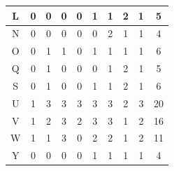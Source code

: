 \documentclass[submit,ses,noauthor]{ipsj}
\begin{document}
\begin{table}[t]
\begin{minipage}[t]{0.5\linewidth}
{\begin{tabular}{c|c|cccccccc}
\rowcolor{blue!30}%
L                   & 0                                           & \multicolumn{1}{c|}{0} & \multicolumn{1}{c|}{0} & \multicolumn{1}{c|}{0} & \multicolumn{1}{c|}{1} & \multicolumn{1}{c|}{1} & \multicolumn{1}{c|}{2} & \multicolumn{1}{c|}{1} & 5  \\ \hline
\rowcolor{blue!30}%
N                   & 0                                           & \multicolumn{1}{c|}{0} & \multicolumn{1}{c|}{0} & \multicolumn{1}{c|}{0} & \multicolumn{1}{c|}{0} & \multicolumn{1}{c|}{2} & \multicolumn{1}{c|}{1} & \multicolumn{1}{c|}{1} & 4  \\ \hline
O                   & 0                                           & \multicolumn{1}{c|}{1} & \multicolumn{1}{c|}{1} & \multicolumn{1}{c|}{0} & \multicolumn{1}{c|}{1} & \multicolumn{1}{c|}{1} & \multicolumn{1}{c|}{1} & \multicolumn{1}{c|}{1} & 6  \\ \hline
\rowcolor{blue!30}%
Q                   & 0                                           & \multicolumn{1}{c|}{1} & \multicolumn{1}{c|}{0} & \multicolumn{1}{c|}{0} & \multicolumn{1}{c|}{0} & \multicolumn{1}{c|}{1} & \multicolumn{1}{c|}{2} & \multicolumn{1}{c|}{1} & 5  \\ \hline
S                   & 0                                           & \multicolumn{1}{c|}{1} & \multicolumn{1}{c|}{0} & \multicolumn{1}{c|}{0} & \multicolumn{1}{c|}{1} & \multicolumn{1}{c|}{1} & \multicolumn{1}{c|}{2} & \multicolumn{1}{c|}{1} & 6  \\ \hline
U                   & 1                                           & \multicolumn{1}{c|}{3} & \multicolumn{1}{c|}{3} & \multicolumn{1}{c|}{3} & \multicolumn{1}{c|}{3} & \multicolumn{1}{c|}{3} & \multicolumn{1}{c|}{2} & \multicolumn{1}{c|}{3} & 20 \\ \hline
V                   & 1                                           & \multicolumn{1}{c|}{2} & \multicolumn{1}{c|}{3} & \multicolumn{1}{c|}{2} & \multicolumn{1}{c|}{3} & \multicolumn{1}{c|}{3} & \multicolumn{1}{c|}{1} & \multicolumn{1}{c|}{2} & 16 \\ \hline
W                   & 1                                           & \multicolumn{1}{c|}{1} & \multicolumn{1}{c|}{3} & \multicolumn{1}{c|}{0} & \multicolumn{1}{c|}{2} & \multicolumn{1}{c|}{2} & \multicolumn{1}{c|}{1} & \multicolumn{1}{c|}{2} & 11 \\ \hline
Y                   & 0                                           & \multicolumn{1}{c|}{0} & \multicolumn{1}{c|}{0} & \multicolumn{1}{c|}{0} & \multicolumn{1}{c|}{1} & \multicolumn{1}{c|}{1} & \multicolumn{1}{c|}{1} & \multicolumn{1}{c|}{1} & 4  \\ \hline
\end{tabular}
}
  \end{minipage}
  \vspace{-4mm}
\end{table}
\end{document}
